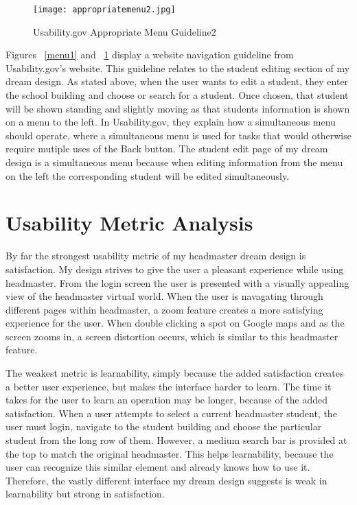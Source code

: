 \documentclass[11pt]{article}
\begin{document}
\begin{figure}[h]
\centering
\texttt{[image: appropriatemenu2.jpg]}
\caption{Usability.gov Appropriate Menu Guideline2}
\label{menu2}
\end{figure}

Figures  ~\ref{menu1} and ~\ref{menu2} display a website navigation guideline from Usability.gov's website. This guideline relates to the student editing section of my dream design. As stated above, when the user wants to edit a student, they enter the school building and choose or search for a student. Once chosen, that student will be shown standing and slightly moving as that students information is shown on a menu to the left. In Usability.gov, they explain how a simultaneous menu should operate, where a simultaneous menu is used for tasks that would otherwise require mutiple uses of the Back button. The student edit page of my dream design is a simultaneous menu because when editing information from the menu on the left the corresponding student will be edited simultaneously. 



\section{Usability Metric Analysis}
By far the strongest usability metric of my headmaster dream design is satisfaction. My design strives to give the user a pleasant experience while using headmaster. From the login screen the user is presented with a visually appealing view of the headmaster virtual world. When the user is navagating through different pages within headmaster, a zoom feature creates a more satisfying experience for the user. When double clicking a spot on Google maps and as the screen zooms in, a screen distortion occurs, which is similar to this headmaster feature.

The weakest metric is learnability, simply because the added satisfaction creates a better user experience, but makes the interface harder to learn. The time it takes for the user to learn an operation may be longer, because of the added satisfaction. When a user attempts to select a current headmaster student, the user must login, navigate to the student building and choose the particular student from the long row of them. However, a medium search bar is provided at the top to match the original headmaster. This helps learnability, because the user can recognize this similar element and already knows how to use it. Therefore, the vastly different interface my dream design suggests is weak in learnability but strong in satisfaction.
\end{document}
